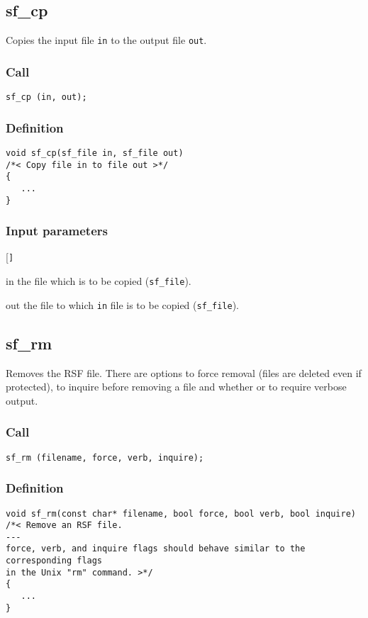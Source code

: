 \subsection{{sf\_cp}}
Copies the input file \texttt{in} to the output file \texttt{out}.

\subsubsection*{Call}
\begin{verbatim}sf_cp (in, out);\end{verbatim}

\subsubsection*{Definition}
\begin{verbatim}
void sf_cp(sf_file in, sf_file out)
/*< Copy file in to file out >*/
{
   ...
}
\end{verbatim}

\subsubsection*{Input parameters}
\begin{desclist}{\tt }{\quad}[\tt ]
   \setlength\itemsep{0pt}
   \item[in] the file which is to be copied (\texttt{sf\_file}). 
   \item[out] the file to which \texttt{in} file is to be copied (\texttt{sf\_file}).  
\end{desclist}




\subsection{{sf\_rm}}
Removes the RSF file. There are options to force removal (files are deleted even if protected), to inquire before removing a file and whether or to require verbose output.

\subsubsection*{Call}
\begin{verbatim}sf_rm (filename, force, verb, inquire);\end{verbatim}

\subsubsection*{Definition}
\begin{verbatim}
void sf_rm(const char* filename, bool force, bool verb, bool inquire)
/*< Remove an RSF file.
---
force, verb, and inquire flags should behave similar to the corresponding flags 
in the Unix "rm" command. >*/
{
   ...
}
\end{verbatim}

